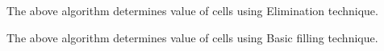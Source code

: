 \documentclass[12pt,a4paper]{article}
\begin{document}
\begin{flushleft}
\verb%FillByElimination()%
\\* \verb%{  count=0;%
\\* \verb%    for(i=0 to 8)%
\\* \verb%      for(j=0 to 8)%
\\* \verb%      {   if( cell not filled)%
\\* \verb%          {   temp=cells[i][j].PossibleValues%
\\* \verb%              temp =  temp -  getUnion(i,j)%
\\* \verb%              if( |temp| = 1)%
\\* \verb%              {   setValueAt(i,j,k)%
\\* \verb%                  count++%
\\* \verb%              }%
\\* \verb%          }%
\\* \verb%      }%
\\* \verb%        return count%
\\* \verb%}%
\end{flushleft}
\ \ \ \ \ The above algorithm determines value of cells using Elimination technique.
\begin{flushleft}
\verb%BasicFilling()%
\\* \verb%{   count=0;%
\\* \verb%    for(i=0 to 8)%
\\* \verb%       for(j=0 to 8)%
\\* \verb%       { if(cells[i][j].value == 0)%
\\* \verb%            if( |cells[i][j].PossibleValues|= 1)%
\\* \verb%            {  setValueAt(i,j,k)%
\\* \verb%               count++%
\\* \verb%            } %
\\* \verb%       }%
\\* \verb%    return count;%
\\* \verb%}%
\end{flushleft}
\ \ \ \ \ The above algorithm determines value of cells using Basic filling technique.
\end{document}
